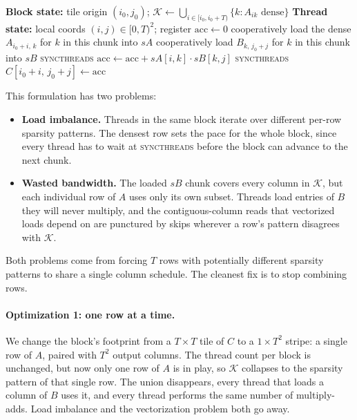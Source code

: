 \documentclass[11pt]{article}
\begin{document}
\begin{algorithm}
\caption{Sparse--dense matmul with row-union column scheduling. One thread block per $T \times T$ tile of $C$.}
\begin{algorithmic}[1]
\Statex \textbf{Block state:} tile origin $(i_0, j_0)$; $\mathcal{K} \gets \bigcup_{i \in [i_0, i_0 + T)} \{k : A_{ik} \text{ dense}\}$
\Statex \textbf{Thread state:} local coords $(i, j) \in [0, T)^2$; register $\mathrm{acc} \gets 0$
    \State cooperatively load the dense $A_{i_0 + i,\, k}$ for $k$ in this chunk into $sA$
    \State cooperatively load $B_{k,\, j_0 + j}$ for $k$ in this chunk into $sB$
    \State \textsc{syncthreads}
            \State $\mathrm{acc} \gets \mathrm{acc} + sA[i, k] \cdot sB[k, j]$
        \EndIf
    \EndFor
    \State \textsc{syncthreads}
\EndFor
\State $C[i_0 + i,\, j_0 + j] \gets \mathrm{acc}$
\end{algorithmic}
\end{algorithm}

This formulation has two problems:
\begin{itemize}
    \item \textbf{Load imbalance.} Threads in the same block iterate over different per-row sparsity patterns. The densest row sets the pace for the whole block, since every thread has to wait at \textsc{syncthreads} before the block can advance to the next chunk.
    \item \textbf{Wasted bandwidth.} The loaded $sB$ chunk covers every column in $\mathcal{K}$, but each individual row of $A$ uses only its own subset. Threads load entries of $B$ they will never multiply, and the contiguous-column reads that vectorized loads depend on are punctured by skips wherever a row's pattern disagrees with $\mathcal{K}$.
\end{itemize}

Both problems come from forcing $T$ rows with potentially different sparsity patterns to share a single column schedule. The cleanest fix is to stop combining rows.

\paragraph{Optimization 1: one row at a time.}
We change the block's footprint from a $T \times T$ tile of $C$ to a $1 \times T^2$ stripe: a single row of $A$, paired with $T^2$ output columns. The thread count per block is unchanged, but now only one row of $A$ is in play, so $\mathcal{K}$ collapses to the sparsity pattern of that single row. The union disappears, every thread that loads a column of $B$ uses it, and every thread performs the same number of multiply-adds. Load imbalance and the vectorization problem both go away.
\end{document}
